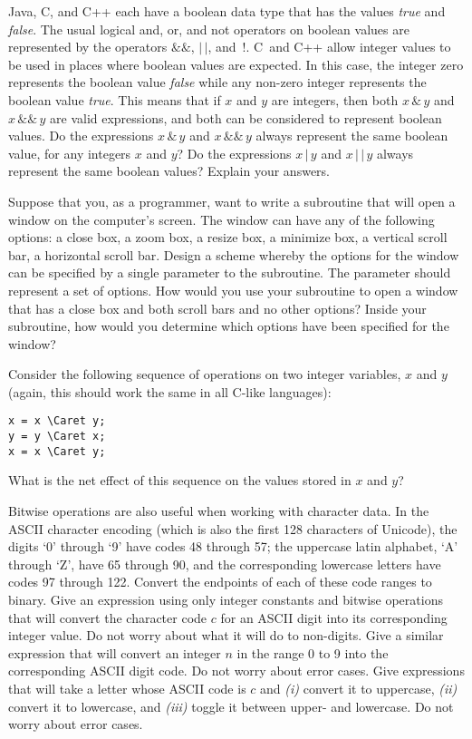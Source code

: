 \begin{exercises}
\problem Java, C, and C++ each have a boolean data type that has the values
\textit{true} and \textit{false}.  The usual logical and, or, and not operators
on boolean values are represented by the operators $\&\&$, $|\,|$, and~!.
C~and C++ allow integer values to be used in places where boolean values
are expected.  In this case, the integer zero represents the boolean
value \textit{false} while any non-zero integer represents the boolean
value \textit{true}.  This means that if $x$ and $y$ are integers,
then both $x\,\&\,y$ and $x\,\&\&\,y$ are valid expressions, and both can
be considered to represent boolean values.  Do the expressions
$x\,\&\,y$ and $x\,\&\&\,y$ always represent the same boolean value,
for any integers $x$ and $y$?  Do the expressions $x\,|\,y$ and $x\,|\,|\,y$
always represent the same boolean values?  Explain your answers.

\problem Suppose that you, as a programmer, want to write a subroutine
that will open a window on the computer's screen.  The window can have
any of the following options:  a close box, a zoom box, a resize box, 
a minimize box, a vertical scroll bar, a horizontal scroll bar.
Design a scheme whereby the options for the window can be specified
by a single parameter to the subroutine.  The parameter should represent
a set of options.  How would you use your subroutine to open
a window that has a close box and both scroll bars and no other options?
Inside your subroutine, how would you determine which options have been
specified for the window?

\problem Consider the following sequence of operations on two integer variables,
$x$ and $y$ (again, this should work the same in all C-like languages):
\begin{Verbatim}
x = x \Caret y;
y = y \Caret x;
x = x \Caret y;
\end{Verbatim}
What is the net effect of this sequence on the values stored in $x$ and $y$?

\problem Bitwise operations are also useful when working with character data.
In the ASCII character encoding (which is also the first 128 characters of Unicode),
the digits `0' through `9' have codes 48 through 57; the uppercase latin alphabet,
`A' through `Z', have 65 through 90, and the corresponding lowercase letters have
codes 97 through 122.
\ppart Convert the endpoints of each of these code ranges to binary.
\ppart Give an expression using only integer constants and bitwise operations that will convert the character code $c$ for an ASCII digit into its corresponding integer value. Do not worry about what it will do to non-digits.
\ppart Give a similar expression that will convert an integer $n$ in the range 0 to 9 into the corresponding ASCII digit code. Do not worry about error cases.
\ppart Give expressions that will take a letter whose ASCII code is $c$ and \textit{(i)} convert it to uppercase, \textit{(ii)} convert it to lowercase, and \textit{(iii)} toggle it between upper- and lowercase. Do not worry about error cases.

\end{exercises}



